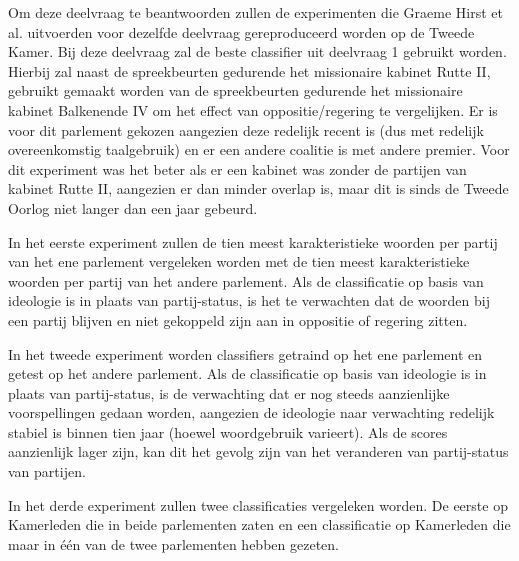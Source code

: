 Om deze deelvraag te beantwoorden zullen de experimenten die Graeme Hirst et al. uitvoerden voor dezelfde deelvraag gereproduceerd worden op de Tweede Kamer. Bij deze deelvraag zal de beste classifier uit deelvraag 1 gebruikt worden. Hierbij zal naast de spreekbeurten gedurende het missionaire kabinet Rutte II, gebruikt gemaakt worden van de spreekbeurten gedurende het missionaire kabinet Balkenende IV om het effect van oppositie/regering te vergelijken. Er is voor dit parlement gekozen aangezien deze redelijk recent is (dus met redelijk overeenkomstig taalgebruik) en er een andere coalitie is met andere premier. Voor dit experiment was het beter als er een kabinet was zonder de partijen van kabinet Rutte II, aangezien er dan minder overlap is, maar dit is sinds de Tweede Oorlog niet langer dan een jaar gebeurd. \par
In het eerste experiment zullen de tien meest karakteristieke woorden per partij van het ene parlement vergeleken worden met de tien meest karakteristieke woorden per partij van het andere parlement. Als de classificatie op basis van ideologie is in plaats van partij-status, is het te verwachten dat de woorden bij een partij blijven en niet gekoppeld zijn aan in oppositie of regering zitten. \par
In het tweede experiment worden classifiers getraind op het ene parlement en getest op het andere parlement. Als de classificatie op basis van ideologie is in plaats van partij-status, is de verwachting dat er nog steeds aanzienlijke voorspellingen gedaan worden, aangezien de ideologie naar verwachting redelijk stabiel is binnen tien jaar (hoewel woordgebruik varieert). Als de scores aanzienlijk lager zijn, kan dit het gevolg zijn van het veranderen van partij-status van partijen.\par
In het derde experiment zullen twee classificaties vergeleken worden. De eerste op Kamerleden die in beide parlementen zaten en een classificatie op Kamerleden die maar in één van de twee parlementen hebben gezeten.\par
